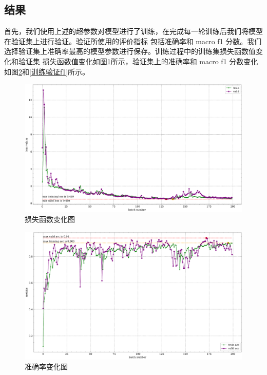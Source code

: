 \documentclass[supercite]{Experimental_Report}
\theoremstyle{definition}
\begin{document}
\subsection{结果}
首先，我们使用上述的超参数对模型进行了训练，在完成每一轮训练后我们将模型在验证集上进行验证。验证所使用的评价指标
包括准确率和 macro f1 分数。我们选择验证集上准确率最高的模型参数进行保存。训练过程中的训练集损失函数值变化和验证集
损失函数值变化如图\ref{训练验证损失函数}所示，验证集上的准确率和 macro f1 分数变化如图\ref{训练验证acc}和\ref{训练验证f1}所示。
\begin{figure}[H]
	\begin{center}
		\includegraphics[scale=0.35]{../images/训练验证损失函数.pdf}
		\caption{损失函数变化图}
		\label{训练验证损失函数}
	\end{center}
\end{figure}
\begin{figure}[H]
	\begin{center}
		\includegraphics[scale=0.35]{../images/训练验证acc.pdf}
		\caption{准确率变化图}
		\label{训练验证acc}
	\end{center}
\end{figure}
\end{document}
